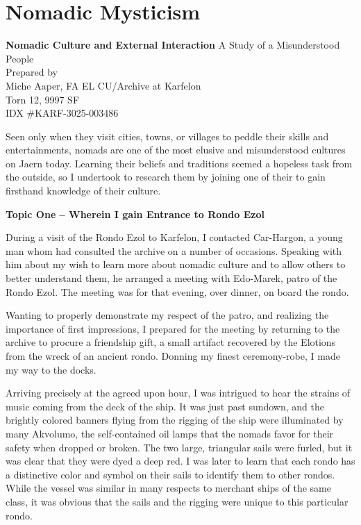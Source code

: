 \chapter{Nomadic Mysticism}
\label{ch:nomad}
\setlength{\columnsep}{\defcolwidth}\begin{multicols*}{2}
\begin{center}
\textbf{Nomadic Culture and External Interaction}
A Study of a Misunderstood People\\
Prepared by\\
Miche Aaper, FA EL CU/Archive at Karfelon\\
Torn 12, 9997 SF\\
IDX \#KARF-3025-003486\\
\end{center}
Seen only when they visit cities, towns, or villages to peddle their skills and entertainments, nomads are one of the most elusive and misunderstood cultures on Jaern today. Learning their beliefs and traditions seemed a hopeless task from the outside, so I undertook to research them by joining one of their  to gain firsthand knowledge of their culture.

\textbf{Topic One – Wherein I gain Entrance to Rondo Ezol}

During a visit of the Rondo Ezol to Karfelon, I contacted Car-Hargon, a young man whom had consulted the
archive on a number of occasions. Speaking with him about my wish to learn more about nomadic culture and to allow
others to better understand them, he arranged a meeting with Edo-Marek, patro of the Rondo Ezol. The meeting was for
that evening, over dinner, on board the rondo.

Wanting to properly demonstrate my respect of the patro, and realizing the importance of first impressions, I prepared for the meeting by returning to the archive to procure a friendship gift, a small artifact recovered by the Elotions from the wreck of an ancient rondo. Donning my finest ceremony-robe, I made my way to the docks.

Arriving precisely at the agreed upon hour, I was intrigued to hear the strains of music coming from the deck of the ship. It was just past sundown, and the brightly colored banners flying from the rigging of the ship were illuminated by many Akvolumo, the self-contained oil lamps that the nomads favor for their safety when dropped or broken. The two large, triangular sails were furled, but it was clear that they were dyed a deep red. I was later to learn that each rondo has a distinctive color and symbol on their sails to identify them to other rondos. While the vessel was similar in many respects to merchant ships of the same class, it was obvious that the sails and the rigging were unique to this particular rondo.


\end{multicols*}
